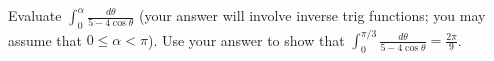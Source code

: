 Evaluate $\displaystyle{\int_{0}^{\alpha} \frac{d\theta}{5 - 4 \cos \theta}}$
(your answer will involve inverse trig functions; you may assume that $0 \le
\alpha < \pi$).  Use your answer to show that $\displaystyle{\int_{0}^{\pi/3}
\frac{d\theta}{5 - 4 \cos \theta}} = \frac{2\pi}{9}$.
